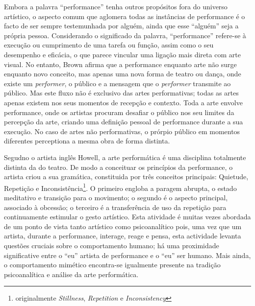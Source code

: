 \documentclass[../main.tex]{subfiles}
\begin{document}
Embora a palavra \enquote{performance} tenha outros propósitos fora do universo artístico, o aspecto comum que aglomera todas as instâncias de performance é o facto de ser sempre testemunhada por alguém, ainda que esse \enquote{alguém} seja a própria pessoa\cite{carlson1996}. Considerando o significado da palavra, \enquote{performance} refere-se à execução ou cumprimento de uma tarefa ou função, assim como o seu desempenho e eficácia\cite{oxford}, o que parece vincular uma ligação mais direta com arte visual\cite{brisley}. No entanto, Brown afirma que a performance enquanto arte não surge enquanto novo conceito, mas apenas uma nova forma de teatro ou dança, onde existe um \textsl{performer}, o público e a mensagem que o \textsl{performer} transmite ao público\cite{brown_battcock}. Mas este fluxo não é exclusivo das artes performativas; todas as artes apenas existem nos seus momentos de recepção e contexto\cite{gadamer}. Toda a arte envolve performance\cite{brisley}, onde os artistas procuram desafiar o público nos seu limites da percepção da arte, criando uma definição pessoal de performance durante a sua execução\cite{goldberg_battcock}. No caso de artes não performativas, o prórpio público em momentos diferentes perceptiona a mesma obra de forma distinta\cite{gadamer}.

Segudno o artista inglês Howell, a arte performática é uma disciplina totalmente distinta da do teatro\cite{howell1999}. De modo a conceituar os princípios da performance, o artista criou a sua gramática, constituida por três conceitos principais: Quietude, Repetição e Inconsistência\footnote{originalmente \textit{Stillness}, \textit{Repetition} e \textit{Inconsistency}}. O primeiro engloba a paragem abrupta, o estado meditativo e transição para o movimento; o segundo é o aspecto principal, associado à obcessão; o terceiro é a transferência de uso da repetição para continuamente estimular o gesto artístico. Esta atividade é muitas vezes abordada de um ponto de vista tanto artístico como psicoanalítico pois, uma vez que um artista, durante a performance, interage, reage e pensa, esta actividade levanta questões cruciais sobre o comportamento humano\cite{kear}; há uma proximidade significative entre o \enquote{eu} artista de performance e o \enquote{eu} ser humano\cite{carlson1996}. Mais ainda, o comportamento mimético encontra-se igualmente presente na tradição psicoanalítica e análise da arte performática\cite{howell1999,read}.

\end{document}
